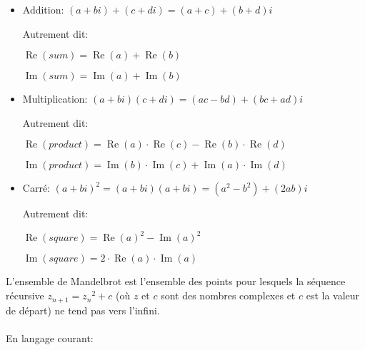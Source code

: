\begin{itemize}
\item Addition: $(a+bi) + (c+di) = (a+c) + (b+d)i$

Autrement dit:

$\operatorname{Re}(sum) = \operatorname{Re}(a) + \operatorname{Re}(b)$

$\operatorname{Im}(sum) = \operatorname{Im}(a) + \operatorname{Im}(b)$

\item Multiplication: $(a+bi) (c+di) = (ac-bd) + (bc+ad)i$

Autrement dit:

$\operatorname{Re}(product) = \operatorname{Re}(a) \cdot \operatorname{Re}(c) - \operatorname{Re}(b) \cdot \operatorname{Re}(d)$

$\operatorname{Im}(product) = \operatorname{Im}(b) \cdot \operatorname{Im}(c) + \operatorname{Im}(a) \cdot \operatorname{Im}(d)$

\item Carré: $(a+bi)^2 = (a+bi) (a+bi) = (a^2-b^2) + (2ab)i$

Autrement dit:

$\operatorname{Re}(square) = \operatorname{Re}(a)^2-\operatorname{Im}(a)^2$

$\operatorname{Im}(square) = 2 \cdot \operatorname{Re}(a) \cdot \operatorname{Im}(a)$

\end{itemize}


L'ensemble de Mandelbrot est l'ensemble des points pour lesquels la séquence récursive
$z_{n+1} = {z_n}^2 + c$ (où $z$ et $c$ sont des nombres complexes et $c$ est la valeur
de départ) ne tend pas vers l'infini.\\
\\
En langage courant:

